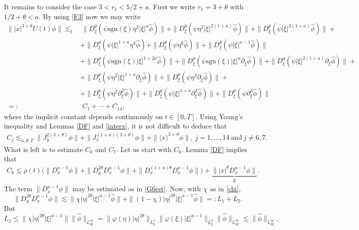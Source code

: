 \documentclass[reqno]{amsart}
\newcommand{\ha}{\hat{\phi}}
\newcommand{\si}{\sgn(\xi)}
\newcommand{\lanx}{\langle x \rangle}
\newcommand{\dte}{D^{\theta}_\xi}
\newcommand{\p}{\partial}
\newcommand{\sgn}{\text{sgn}}
\numberwithin{equation}{section}
\begin{document}
It remains to consider the case $3<r_1<5/2+a$. First we write $r_1=3+\theta$ with $1/2+\theta<a$. By using \eqref{F3} now we may write
\begin{equation}\label{D3s}
\begin{split}
	\||x|^{3+\theta}U(t)\phi\|\lesssim_{t} & \ \|\dte(\psi\sgn(\xi)\eta^2|\xi|^a \ha)\|+\|\dte(\psi\eta^2|\xi|^{2(1+a)} \ha)\|+\|\dte(\psi|\xi|^{3(1+a)} \ha)\|+\\
	&+\|\dte(\psi |\xi|^{1+a}\eta^4 \ha)+\|\dte(\psi\eta^6 \ha)\|+\|\dte(\psi |\xi|^{a-1} \ha)\|\\
	&+\|\dte(\psi \si|\xi|^{1+2a} \ha)\|+\|\dte(\psi\sgn(\xi)|\xi|^a \p_\xi\ha)\|+\|\dte(\psi |\xi|^{2(1+a)} \p_\xi\ha)\|+\\
	&+\|\dte(\psi \eta^2 |\xi|^{1+a} \p_\xi\ha)\|+\|\dte(\psi \eta^4 \p_\xi\ha)\|+\\
	&+\|\dte(\psi \eta^2 \p_\xi^2\ha)\|+\|\dte(\psi |\xi|^{1+a}\p_\xi^2\ha)\|+\|\dte(\psi \p_\xi^3\ha)\|\\
	=:&\,\,C_1+\cdots+C_{14},
\end{split}
\end{equation}
where the implicit constant depends continuously on $t\in[0,T]$. Using Young's inequality and Lemmas \ref{DF} and \ref{interx}, it is not difficult to deduce that
\begin{equation}\label{allCs}
\begin{split}
C_j \lesssim_{a,\theta,T} \|J_y^{2(3+\theta)}\phi\|+\|J_x^{(1+a)(3+\theta)}\phi\|+\|\lanx^{3+\theta}\phi\|, \ j=1,...,14 \ \mbox{and} \ j\not=6,7.
\end{split}
\end{equation}
What is left is to estimate $C_6$ and $C_7$. Let us start with $C_6$. Lemma \ref{DF} implies that
\begin{equation}
\begin{split}\label{c6}
C_6\lesssim \rho(t)\big(\|D^{a-1}_x\phi\|+\|D_y^{2\theta}D^{a-1}_x\phi\|+\|D^{(1+a)\theta}_xD^{a-1}_x\phi\|\big)+\underbrace{\||x|^\theta D^{a-1}_x\phi\|}_{E}.
\end{split}
\end{equation}
The term $\|D^{a-1}_x\phi\|$ may be estimated as in \eqref{G6est}. Now, with $\chi$ as in \eqref{chi},
$$
\|D_y^{2\theta}D^{a-1}_x\phi\|\lesssim \|\chi|\eta|^{2\theta}|\xi|^{a-1}\hat{\phi}\|+ \|(1-\chi)|\eta|^{2\theta}|\xi|^{a-1}\hat{\phi}\|=:L_1+L_2.
$$
But 
\begin{equation*}
L_1\leq \|\chi|\eta|^{2\theta}|\xi|^{a-1}\|\|\hat{\phi}\|_{L^\infty_{\eta \xi}}=\|\varphi(\eta)|\eta|^{2\theta}\|_{L^2_\eta}\|\varphi(\xi)|\xi|^{a-1}\|_{L^2_{\xi}}\|\hat{\phi}\|_{L^\infty_{\eta \xi}}\lesssim \|\hat{\phi}\|_{L^\infty_{\eta \xi}},
\end{equation*}
\end{document}
